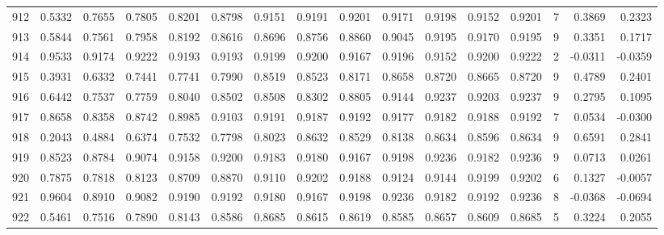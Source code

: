 \begin{tabular}{lrrrrrrrrrrrrrrr}
912 &      0.5332 &  0.7655 &  0.7805 &  0.8201 &  0.8798 &  0.9151 &  0.9191 &  0.9201 &  0.9171 &  0.9198 &   0.9152 &     0.9201 &      7 &                    0.3869 &                     0.2323 \\
913 &      0.5844 &  0.7561 &  0.7958 &  0.8192 &  0.8616 &  0.8696 &  0.8756 &  0.8860 &  0.9045 &  0.9195 &   0.9170 &     0.9195 &      9 &                    0.3351 &                     0.1717 \\
914 &      0.9533 &  0.9174 &  0.9222 &  0.9193 &  0.9193 &  0.9199 &  0.9200 &  0.9167 &  0.9196 &  0.9152 &   0.9200 &     0.9222 &      2 &                   -0.0311 &                    -0.0359 \\
915 &      0.3931 &  0.6332 &  0.7441 &  0.7741 &  0.7990 &  0.8519 &  0.8523 &  0.8171 &  0.8658 &  0.8720 &   0.8665 &     0.8720 &      9 &                    0.4789 &                     0.2401 \\
916 &      0.6442 &  0.7537 &  0.7759 &  0.8040 &  0.8502 &  0.8508 &  0.8302 &  0.8805 &  0.9144 &  0.9237 &   0.9203 &     0.9237 &      9 &                    0.2795 &                     0.1095 \\
917 &      0.8658 &  0.8358 &  0.8742 &  0.8985 &  0.9103 &  0.9191 &  0.9187 &  0.9192 &  0.9177 &  0.9182 &   0.9188 &     0.9192 &      7 &                    0.0534 &                    -0.0300 \\
918 &      0.2043 &  0.4884 &  0.6374 &  0.7532 &  0.7798 &  0.8023 &  0.8632 &  0.8529 &  0.8138 &  0.8634 &   0.8596 &     0.8634 &      9 &                    0.6591 &                     0.2841 \\
919 &      0.8523 &  0.8784 &  0.9074 &  0.9158 &  0.9200 &  0.9183 &  0.9180 &  0.9167 &  0.9198 &  0.9236 &   0.9182 &     0.9236 &      9 &                    0.0713 &                     0.0261 \\
920 &      0.7875 &  0.7818 &  0.8123 &  0.8709 &  0.8870 &  0.9110 &  0.9202 &  0.9188 &  0.9124 &  0.9144 &   0.9199 &     0.9202 &      6 &                    0.1327 &                    -0.0057 \\
921 &      0.9604 &  0.8910 &  0.9082 &  0.9190 &  0.9192 &  0.9180 &  0.9167 &  0.9198 &  0.9236 &  0.9182 &   0.9192 &     0.9236 &      8 &                   -0.0368 &                    -0.0694 \\
922 &      0.5461 &  0.7516 &  0.7890 &  0.8143 &  0.8586 &  0.8685 &  0.8615 &  0.8619 &  0.8585 &  0.8657 &   0.8609 &     0.8685 &      5 &                    0.3224 &                     0.2055 \\

\end{tabular}
